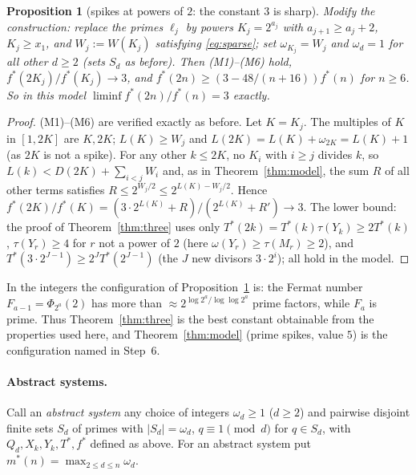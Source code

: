 \documentclass[11pt]{article}
\newtheorem{proposition}[theorem]{Proposition}
\theoremstyle{remark}
\begin{document}
\begin{proposition}[spikes at powers of $2$: the constant $3$ is sharp]\label{prop:fermat}
Modify the construction: replace the primes $\ell_j$ by powers $K_j=2^{a_j}$ with $a_{j+1}\ge a_j+2$,
$K_j\ge x_1$, and $W_j:=W(K_j)$ satisfying \eqref{eq:sparse}; set $\omega_{K_j}=W_j$ and
$\omega_d=1$ for all other $d\ge2$ (sets $S_d$ as before). Then (M1)--(M6) hold,
$f^*(2K_j)/f^*(K_j)\to3$, and $f^*(2n)\ge(3-48/(n+16))f^*(n)$ for $n\ge6$. So in this model
$\liminf f^*(2n)/f^*(n)=3$ exactly.
\end{proposition}
\begin{proof}
(M1)--(M6) are verified exactly as before. Let $K=K_j$. The multiples of $K$ in $[1,2K]$ are $K,2K$;
$L(K)\ge W_j$ and $L(2K)=L(K)+\omega_{2K}=L(K)+1$ (as $2K$ is not a spike). For any other
$k\le2K$, no $K_i$ with $i\ge j$ divides $k$, so $L(k)<D(2K)+\sum_{i<j}W_i$ and, as in
Theorem~\ref{thm:model}, the sum $R$ of all other terms satisfies $R\le2^{W_j/2}\le2^{L(K)-W_j/2}$.
Hence $f^*(2K)/f^*(K)=(3\cdot2^{L(K)}+R)/(2^{L(K)}+R')\to3$. The lower bound: the proof of
Theorem~\ref{thm:three} uses only $T^*(2k)=T^*(k)\tau(Y_k)\ge2T^*(k)$, $\tau(Y_r)\ge4$ for $r$ not a
power of $2$ (here $\omega(Y_r)\ge\tau(M_r)\ge2$), and
$T^*(3\cdot2^{J-1})\ge2^{J}T^*(2^{J-1})$ (the $J$ new divisors $3\cdot2^i$); all hold in the model.
\end{proof}

In the integers the configuration of Proposition~\ref{prop:fermat} is: the Fermat number
$F_{a-1}=\Phi_{2^a}(2)$ has more than $\approx2^{\log 2^a/\log\log 2^a}$ prime factors, while
$F_a$ is prime. Thus Theorem~\ref{thm:three} is the best constant obtainable from the properties used
here, and Theorem~\ref{thm:model} (prime spikes, value $5$) is the configuration named in Step~6.

\paragraph{Abstract systems.} Call an \emph{abstract system} any choice of integers
$\omega_d\ge1$ ($d\ge2$) and pairwise disjoint finite sets $S_d$ of primes with $|S_d|=\omega_d$,
$q\equiv1\pmod d$ for $q\in S_d$, with $Q_d,X_k,Y_k,T^*,f^*$ defined as above. For an abstract
system put $m^*(n)=\max_{2\le d\le n}\omega_d$.
\end{document}
